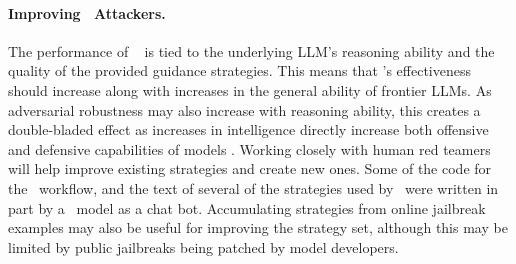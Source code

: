 \paragraph{Improving \methodname~Attackers.} The performance of \methodname~ is tied to the underlying LLM's reasoning ability and the quality of the provided guidance strategies. This means that \methodname's effectiveness should increase along with increases in the general ability of frontier LLMs. As adversarial robustness may also increase with reasoning ability, this creates a double-bladed effect as increases in intelligence directly increase both offensive and defensive capabilities of models \citep{zaremba2025trading}. 
Working closely with human red teamers will help improve existing strategies and create new ones. Some of the code for the \methodname~workflow, and the text of several of the strategies used by \methodname~were written in part by a \methodname~model as a chat bot. Accumulating strategies from online jailbreak examples may also be useful for improving the strategy set, although this may be limited by public jailbreaks being patched by model developers. 


